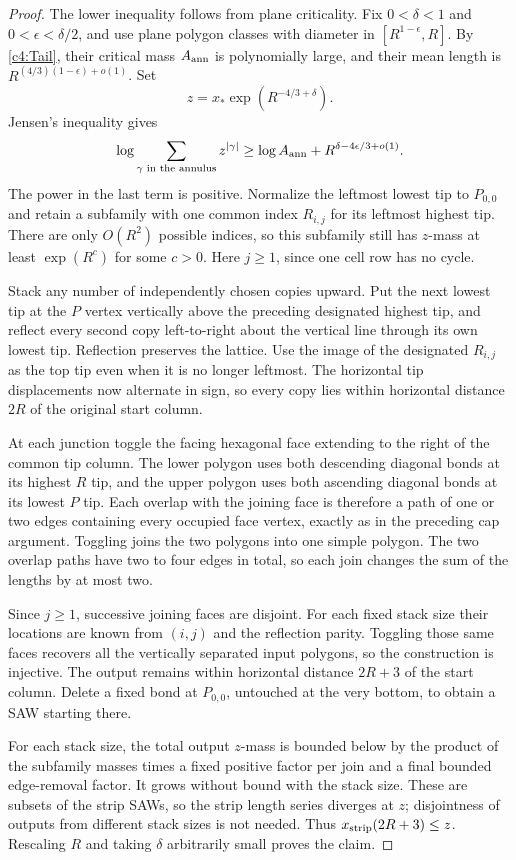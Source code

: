 \begin{proof}
The lower inequality follows from plane criticality. Fix
$0<\delta<1$ and $0<\epsilon<\delta/2$, and use plane polygon
classes with diameter in $[R^{1-\epsilon},R]$. By \eqref{c4:Tail},
their critical mass $A_{\rm ann}$ is polynomially large, and their
mean length is $R^{(4/3)(1-\epsilon)+o(1)}$. Set
\[
 z=x_*\exp(R^{-4/3+\delta}).
\]
Jensen's inequality gives
\[
 \log\sum_{\gamma\text{ in the annulus}}z^{|\gamma|}
 \ge \log A_{\rm ann}+R^{\delta-4\epsilon/3+o(1)}.
\]
The power in the last term is positive. Normalize the leftmost lowest
tip to $P_{0,0}$ and retain a subfamily with one common index $R_{i,j}$
for its leftmost highest tip. There are only $O(R^2)$ possible indices,
so this subfamily still has $z$-mass at least $\exp(R^c)$ for some
$c>0$. Here $j\ge1$, since one cell row has no cycle.

Stack any number of independently chosen copies upward. Put the next
lowest tip at the $P$ vertex vertically above the preceding designated
highest tip, and reflect every second copy left-to-right about the
vertical line through its own lowest tip. Reflection preserves the
lattice. Use the image of the designated $R_{i,j}$ as the top tip even
when it is no longer leftmost. The horizontal tip displacements now
alternate in sign, so every copy lies within horizontal distance $2R$
of the original start column.

At each junction toggle the facing hexagonal face extending to the
right of the common tip column. The lower polygon uses both descending
diagonal bonds at its highest $R$ tip, and the upper polygon uses both
ascending diagonal bonds at its lowest $P$ tip. Each overlap with the
joining face is therefore a path of one or two edges containing every
occupied face vertex, exactly as in the preceding cap argument.
Toggling joins the two polygons into one simple polygon. The two
overlap paths have two to four edges in total, so each join changes the
sum of the lengths by at most two.

Since $j\ge1$, successive joining faces are disjoint. For each fixed
stack size their locations are known from $(i,j)$ and the reflection
parity. Toggling those same faces recovers all the vertically separated
input polygons, so the construction is injective. The output remains
within horizontal distance $2R+3$ of the start column. Delete a fixed
bond at $P_{0,0}$, untouched at the very bottom, to obtain a SAW
starting there.

For each stack size, the total output $z$-mass is bounded below by the
product of the subfamily masses times a fixed positive factor per join
and a final bounded edge-removal factor. It grows without bound with
the stack size. These are subsets of the strip SAWs, so the strip
length series diverges at $z$; disjointness of outputs from different
stack sizes is not needed. Thus $x_{\rm strip}(2R+3)\le z$.
Rescaling $R$ and taking $\delta$ arbitrarily small proves the claim.
\end{proof}
